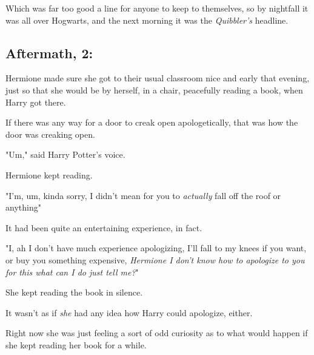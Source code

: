 Which was far too good a line for anyone to keep to themselves, so by nightfall
it was all over Hogwarts, and the next morning it was the \emph{Quibbler's}
headline.
\sbreak
\subsection{Aftermath, 2:}

Hermione made sure she got to their usual classroom nice and early that
evening, just so that she would be by herself, in a chair, peacefully reading a
book, when Harry got there.

If there was any way for a door to creak open apologetically, that was how the
door was creaking open.

"Um," said Harry Potter's voice.

Hermione kept reading.

"I'm, um, kinda sorry, I didn't mean for you to \emph{actually} fall off the
roof or anything{\el}"

It had been quite an entertaining experience, in fact.

"I, ah{\el} I don't have much experience apologizing, I'll fall to my knees
if you want, or buy you something expensive, \emph{Hermione I don't know how to
apologize to you for this what can I do just tell me?}"

She kept reading the book in silence.

It wasn't as if \emph{she} had any idea how Harry could apologize, either.

Right now she was just feeling a sort of odd curiosity as to what would happen
if she kept reading her book for a while.

